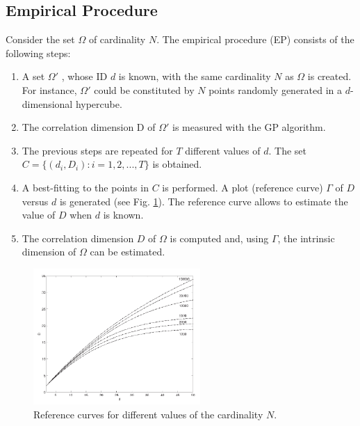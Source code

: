 \documentclass[journal]{IEEEtran}
\begin{document}
\subsection{Empirical Procedure}

Consider the set \(\Omega\) of cardinality \(N\). The empirical procedure (EP) consists of the following steps:

\begin{enumerate}[\IEEEsetlabelwidth{12)}]
  \item A set \(\Omega'\) , whose ID \(d\) is known, with the same cardinality \(N\) as  \(\Omega\) is created. 
  For instance, \(\Omega'\) could be constituted by \(N\) points randomly generated in a \(d\)-dimensional hypercube.
  
  \item The correlation dimension D of \(\Omega'\) is measured with the GP algorithm.
  
  \item The previous steps are repeated for \(T\) different values of \(d\). 
  The set \(C = \{(d_i, D_i) : i = 1,2,...,T\}\) is obtained.
  
  \item A best-fitting to the points in \(C\) is performed. 
  A plot (reference curve) \(\Gamma\) of \(D\) versus \(d\) is generated (see Fig. \ref{fig_reference_plot}). 
  The reference curve allows to estimate the value of \(D\) when \(d\) is known.
  
  \item The correlation dimension \(D\) of \(\Omega\) is computed and, using \(\Gamma\), 
  the intrinsic dimension of \(\Omega\) can be estimated.
  
\end{enumerate}
  

\begin{figure}[!t]
  \centering
  \includegraphics[width=2.5in]{fig-4.png}
  \caption{Reference curves for different values of the cardinality \(N\).}
  \label{fig_reference_plot}
\end{figure}
\end{document}
